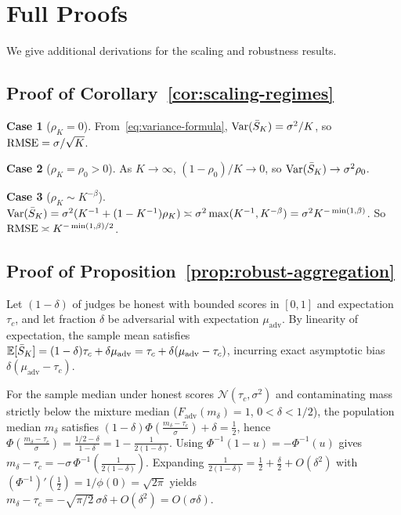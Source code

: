 \section{Full Proofs}
\label{app:proofs}

We give additional derivations for the scaling and robustness results.

\subsection{Proof of Corollary~\ref{cor:scaling-regimes}}

\textbf{Case 1} ($\rho_K = 0$). From~\eqref{eq:variance-formula},
$\mathrm{Var}(\bar{S}_K) = \sigma^2/K$, so $\mathrm{RMSE} = \sigma/\sqrt{K}$.

\textbf{Case 2} ($\rho_K = \rho_0 > 0$). As $K \to \infty$,
$(1-\rho_0)/K \to 0$, so $\mathrm{Var}(\bar{S}_K) \to \sigma^2\rho_0$.

\textbf{Case 3} ($\rho_K \sim K^{-\beta}$).
$\mathrm{Var}(\bar{S}_K) = \sigma^2(K^{-1} + (1-K^{-1})\rho_K)
\asymp \sigma^2 \max(K^{-1}, K^{-\beta})
= \sigma^2 K^{-\min(1,\beta)}$.
So $\mathrm{RMSE} \asymp K^{-\min(1,\beta)/2}$.

\subsection{Proof of Proposition~\ref{prop:robust-aggregation}}

Let $(1-\delta)$ of judges be honest with bounded scores in $[0,1]$ and expectation $\tau_c$, and let fraction $\delta$ be adversarial with expectation $\mu_{\mathrm{adv}}$. By linearity of expectation, the sample mean satisfies $\mathbb{E}[\bar{S}_K] = (1-\delta)\tau_c + \delta\mu_{\mathrm{adv}} = \tau_c + \delta(\mu_{\mathrm{adv}} - \tau_c)$, incurring exact asymptotic bias $\delta(\mu_{\mathrm{adv}} - \tau_c)$.

For the sample median under honest scores $\mathcal{N}(\tau_c, \sigma^2)$ and contaminating mass strictly below the mixture median ($F_{\mathrm{adv}}(m_\delta)=1$, $0<\delta<1/2$), the population median $m_\delta$ satisfies $(1-\delta)\Phi\!\left(\frac{m_\delta - \tau_c}{\sigma}\right) + \delta = \frac{1}{2}$, hence $\Phi\!\left(\frac{m_\delta - \tau_c}{\sigma}\right) = \frac{1/2 - \delta}{1 - \delta} = 1 - \frac{1}{2(1-\delta)}$. Using $\Phi^{-1}(1 - u) = -\Phi^{-1}(u)$ gives $m_\delta - \tau_c = -\sigma\,\Phi^{-1}\!\left(\frac{1}{2(1-\delta)}\right)$. Expanding $\frac{1}{2(1-\delta)} = \frac{1}{2} + \frac{\delta}{2} + O(\delta^2)$ with $(\Phi^{-1})'(\tfrac{1}{2}) = 1/\phi(0) = \sqrt{2\pi}$ yields $m_\delta - \tau_c = -\sqrt{\pi/2}\,\sigma\delta + O(\delta^2) = O(\sigma\delta)$.


